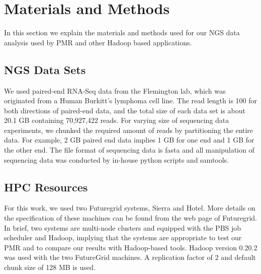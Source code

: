 \documentclass{acm_proc_article-sp}
\begin{document}
\section{Materials and Methods}\label{sec:materials_and_methods} 
In this section we explain the materials and methods used for our NGS data analysis used by PMR and other Hadoop based applications.

\subsection{NGS Data Sets}
We used paired-end RNA-Seq data from the Flemington lab, which was originated from a Human Burkitt's lymphoma cell line\cite{erik_2010}. The read length is 100 for both directions of paired-end data, and the total size of each data set is about 20.1 GB containing 70,927,422 reads.  For varying size of sequencing data experiments, we chunked the required amount of reads by partitioning the entire data.  For example, 2 GB paired end data implies 1 GB for one end and 1 GB for the other end.  The file format of sequencing data is fasta and all manipulation of sequencing data was conducted by in-house python scripts and samtools\cite{samtools}.  

\subsection{HPC Resources}
For this work, we used two Futuregrid systems, Sierra and Hotel.  More details on the specification of these machines can be found from the web page of Futuregrid\cite{futuregrid_url}.  In brief, two systems are multi-node clusters and equipped with the PBS job scheduler and Hadoop, implying that the systems are appropriate to test our PMR and to compare our results with Hadoop-based tools. Hadoop version 0.20.2 was used with the two FutureGrid machines. A replication factor of 2 and default chunk size of 128 MB is used. 
\end{document}
